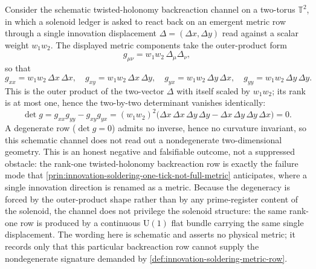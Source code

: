 \begin{principle}
\label{prin:innovation-soldering-twisted-holonomy-backreaction-degenerate}
Consider the schematic twisted-holonomy backreaction channel on a
two-torus $\mathbb T^2$, in which a solenoid ledger is asked to react
back on an emergent metric row through a single innovation displacement
$\Delta=(\Delta x,\Delta y)$ read against a scalar weight $w_1 w_2$. The
displayed metric components take the outer-product form
$$
g_{\mu\nu}=w_1 w_2\,\Delta_\mu\Delta_\nu,
$$
so that
$$
g_{xx}=w_1 w_2\,\Delta x\,\Delta x,
\quad
g_{xy}=w_1 w_2\,\Delta x\,\Delta y,
\quad
g_{yx}=w_1 w_2\,\Delta y\,\Delta x,
\quad
g_{yy}=w_1 w_2\,\Delta y\,\Delta y.
$$
This is the outer product of the two-vector $\Delta$ with itself scaled
by $w_1 w_2$; its rank is at most one, hence the two-by-two determinant
vanishes identically:
$$
\det g
=
g_{xx}g_{yy}-g_{xy}g_{yx}
=
(w_1 w_2)^2\bigl(\Delta x\,\Delta x\,\Delta y\,\Delta y
-\Delta x\,\Delta y\,\Delta y\,\Delta x\bigr)
=
0.
$$
A degenerate row ($\det g=0$) admits no inverse, hence no curvature
invariant, so this schematic channel does not read out a nondegenerate
two-dimensional geometry. This is an honest negative and falsifiable
outcome, not a suppressed obstacle: the rank-one twisted-holonomy
backreaction row is exactly the failure mode that
\autoref{prin:innovation-soldering-one-tick-not-full-metric} anticipates,
where a single innovation direction is renamed as a metric. Because the
degeneracy is forced by the outer-product shape rather than by any
prime-register content of the solenoid, the channel does not privilege
the solenoid structure: the same rank-one row is produced by a
continuous $\mathrm U(1)$ flat bundle carrying the same single
displacement. The wording here is schematic and asserts no physical
metric; it records only that this particular backreaction row cannot
supply the nondegenerate signature demanded by
\autoref{def:innovation-soldering-metric-row}.
\end{principle}

